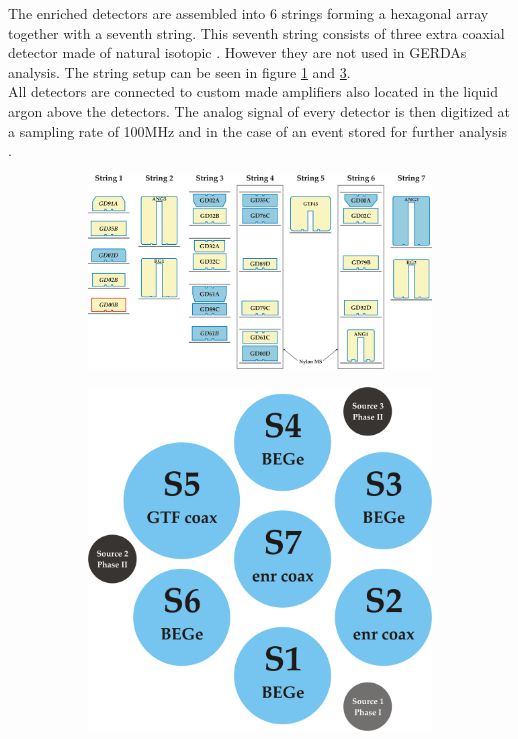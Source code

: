 \documentclass[encoding=utf8,british]{tumphthesis}
\begin{document}
The enriched detectors are assembled into 6 strings forming a hexagonal array together with a seventh string.
This seventh string consists of three extra coaxial detector made of natural isotopic .
However they are not used in GERDAs analysis.
The string setup can be seen in figure \ref{fig:strings} and \ref{fig:stringsabove}.
\\

All detectors are connected to custom made amplifiers also located in the liquid argon above the detectors.
The analog signal of every detector is then digitized at a sampling rate of 100MHz and in the case of an event stored for further analysis \cite{riboldi_cryogenic_2015}.
\\

\begin{figure}[t!]
	\centering
	\begin{subfigure}{.66\textwidth}
		\centering
		\includegraphics[width=.9\textwidth]{./Bilder/strings.png}
		\caption{}
		\label{fig:strings}
	\end{subfigure}%
	\begin{subfigure}{.30\textwidth}
		\centering
		\includegraphics[width=.9\textwidth]{./Bilder/strings-top.png}
		\caption{}
		\label{fig:stringsabove}
	\end{subfigure}
\end{figure}
\end{document}
